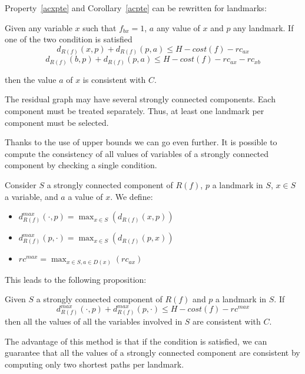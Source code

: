 Property~\ref{acxpte} and Corollary~\ref{acpte} can be rewritten for landmarks:
\begin{proposition}        \label{proposition:consistentArcWithHub}
    Given any variable $x$ such that $f_{bx} = 1$, $a$ any value of $x$ and $p$ any landmark. If one of the two condition is satisfied
   \[d_{R(f)}(x, p) + d_{R(f)}(p, a) \leq H - cost(f) - rc_{ax}\] 
    \[d_{R(f)}(b, p) + d_{R(f)} (p, a) \leq H - cost(f) - rc_{ax} - rc_{xb}\]
    
    then the value $a$ of $x$ is consistent with $C$.
\end{proposition}

The residual graph may have several strongly connected components. Each component must be treated separately. Thus, at least one landmark per component must be selected.

Thanks to the use of upper bounds we can go even further. It is possible to compute the consistency of all values of variables of a strongly connected component by checking a single condition.

\begin{definition}
    Consider $S$ a strongly connected component of $R(f)$, $p$ a landmark in $S$, $x \in S$ a variable, and $a$ a value of $x$. We define:
\begin{itemize}
    \item $d^{max}_{R(f)}(\cdot, p)=\max_{x \in S}(d_{R(f)}(x, p))$ 
    \item $d^{max}_{R(f)}(p, \cdot)=\max_{x \in S}(d_{R(f)}(p, x))$
    \item $rc^{max}=\max_{x \in S, a \in D(x)}(rc_{ax})$ 
\end{itemize}
\end{definition}

This leads to the following proposition:
\begin{proposition}        \label{proposition:formulemagique}
        Given $S$ a strongly connected component of $R(f)$ and $p$ a landmark in $S$. If 
        $$d^{max}_{R(f)}(\cdot, p) + d^{max}_{R(f)}(p, \cdot) \leq H - cost(f) - rc^{max}$$
        then all the values of all the variables involved in $S$ are consistent with $C$.
    \end{proposition}


The advantage of this method is that if the condition is satisfied, we can guarantee that all the values of a strongly connected component are consistent by computing only two shortest paths per landmark.


